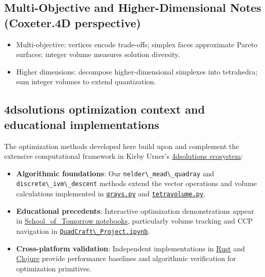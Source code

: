 \documentclass[
  10pt,
]{article}
\newcommand{\passthrough}[1]{#1}
\providecommand{\tightlist}{%
  \setlength{\itemsep}{0pt}\setlength{\parskip}{0pt}}
\begin{document}
\hypertarget{multi-objective-and-higher-dimensional-notes-coxeter.4d-perspective}{%
\subsection{Multi-Objective and Higher-Dimensional Notes (Coxeter.4D
perspective)}\label{multi-objective-and-higher-dimensional-notes-coxeter.4d-perspective}}

\begin{itemize}
\tightlist
\item
  Multi-objective: vertices encode trade-offs; simplex faces approximate
  Pareto surfaces; integer volume measures solution diversity.
\item
  Higher dimensions: decompose higher-dimensional simplexes into
  tetrahedra; sum integer volumes to extend quantization.
\end{itemize}

\hypertarget{dsolutions-optimization-context-and-educational-implementations}{%
\subsection{4dsolutions optimization context and educational
implementations}\label{dsolutions-optimization-context-and-educational-implementations}}

The optimization methods developed here build upon and complement the
extensive computational framework in Kirby Urner's
\href{https://github.com/4dsolutions}{4dsolutions ecosystem}:

\begin{itemize}
\item
  \textbf{Algorithmic foundations}: Our
  \passthrough{\lstinline!nelder\_mead\_quadray!} and
  \passthrough{\lstinline!discrete\_ivm\_descent!} methods extend the
  vector operations and volume calculations implemented in
  \href{https://github.com/4dsolutions/m4w/blob/main/qrays.py}{\passthrough{\lstinline!qrays.py!}}
  and
  \href{https://github.com/4dsolutions/m4w/blob/main/tetravolume.py}{\passthrough{\lstinline!tetravolume.py!}}.
\item
  \textbf{Educational precedents}: Interactive optimization
  demonstrations appear in
  \href{https://github.com/4dsolutions/School_of_Tomorrow}{School\_of\_Tomorrow
  notebooks}, particularly volume tracking and CCP navigation in
  \href{https://github.com/4dsolutions/School_of_Tomorrow/blob/master/QuadCraft_Project.ipynb}{\passthrough{\lstinline!QuadCraft\_Project.ipynb!}}.
\item
  \textbf{Cross-platform validation}: Independent implementations in
  \href{https://github.com/4dsolutions/rusty_rays}{Rust} and
  \href{https://github.com/4dsolutions/synmods}{Clojure} provide
  performance baselines and algorithmic verification for optimization
  primitives.
\end{itemize}
\end{document}
